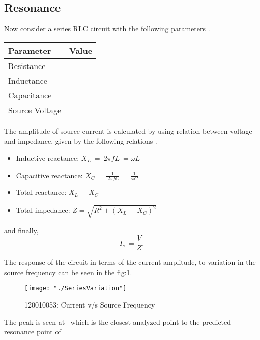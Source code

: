 \documentclass[12pt, twosides]{article}
\newcommand{\rollno}{120010053}
\newcommand{\voltage}{\ensuremath{V}}
\newcommand{\curr}{I}
\newcommand{\res}{R}
\newcommand{\capc}{C}
\newcommand{\ind}{L}
\newcommand{\react}{X}
\begin{document}
		\subsection{Resonance}	
			Now consider a series RLC circuit with the following parameters \cite{AllAbtCirc}.
			\begin{center}
			\begin{tabular}{|l|c|}
				\hline
				Parameter & Value\\ \hline
				Resistance & \serRes\\
				Inductance & \serInd\\
				Capacitance & \serCap\\
				Source Voltage & \serSource\\ \hline
			\end{tabular}
			\end{center}
		
			The amplitude of source current is calculated by using relation between voltage and impedance, given by the following relations \cite{ElecTut}.
			\begin{itemize}[label=\textbullet, leftmargin=*]
				\item Inductive reactance: \( \react_\ind \ = \ 2 \pi f \ind \ = \omega \ind \)
				\item Capacitive reactance: \( \react_\capc \ = \frac{1}{\ 2 \pi f \capc} \ = \frac{1}{\omega \capc} \)
				\item Total reactance: \( \react_\ind \ - \react_\capc\)
				\item Total impedance: \( Z = \sqrt{\res^2 + (\react_\ind \ - \react_\capc)^2} \)

			\end{itemize}			
			and finally,
			\[ \curr_s \ = \frac{\voltage}{Z},\]
	

			The response of the circuit in terms of the current amplitude, to variation in the source frequency can be seen in the fig:\ref{fig:series variation}.
	
			\begin{figure}[H]
			\centering
				\texttt{[image: "./SeriesVariation"]}
			\caption{\rollno: Current v/s Source Frequency}
			\label{fig:series variation}
			\end{figure}	

			The peak is seen at \peakSer \  which is the closest analyzed point to the predicted resonance point of \resonSer

	
		
\end{document}
